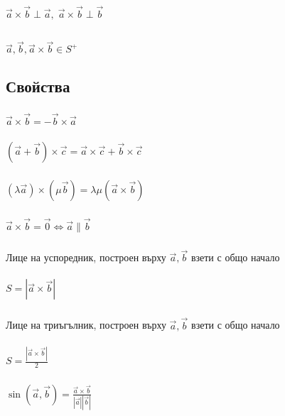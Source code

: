 \documentclass{article}
\newcommand{\vectr}{\overrightarrow}
\begin{document}
    \subsection{}
    \(\vectr{a} \times \vectr{b} \perp \vectr{a}, \; \vectr{a} \times \vectr{b} \perp \vectr{b}\)
    \subsection{}
    \(\vectr{a}, \vectr{b}, \vectr{a} \times \vectr{b} \in S^+\)
    \subsection{Свойства}
    \subsubsection{}
    \(\vectr{a} \times \vectr{b} = - \vectr{b} \times \vectr{a}\)
    \subsubsection{}
    \((\vectr{a} + \vectr{b}) \times \vectr{c} = \vectr{a} \times \vectr{c} + \vectr{b} \times \vectr{c}\)
    \subsubsection{}
    \((\lambda \vectr{a}) \times (\mu \vectr{b}) = \lambda\mu(\vectr{a} \times \vectr{b})\)
    \subsubsection{}
    \(\vectr{a} \times \vectr{b} = \vectr{0} \iff \vectr{a} \parallel \vectr{b}\)
    \subsubsection{}
    Лице на успоредник, построен върху \(\vectr{a}, \vectr{b}\) взети с общо начало\\
    \\\(S = |\vectr{a} \times \vectr{b}|\)
    \subsubsection{}
    Лице на триъгълник, построен върху \(\vectr{a}, \vectr{b}\) взети с общо начало\\
    \\\(S = \frac{|\vectr{a} \times \vectr{b}|}{2}\)
    \subsubsection{}
    \(\sin(\vectr{a}, \vectr{b}) = \frac{\vectr{a} \times \vectr{b}}{|\vectr{a}||\vectr{b}|}\)
\end{document}
